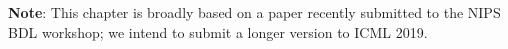 \textbf{Note}: This chapter is broadly based on a paper recently submitted to the NIPS BDL workshop; we intend to submit a longer version to ICML 2019.

